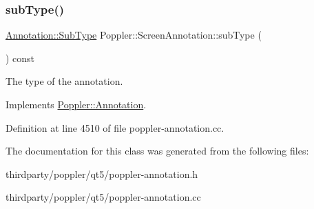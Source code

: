 \mbox{\label{class_poppler_1_1_screen_annotation_a7a8076dfda640ecf040db9acdd8b3ecf}} 
\subsubsection{\texorpdfstring{sub\+Type()}{subType()}}
{\footnotesize\ttfamily \hyperlink{class_poppler_1_1_annotation_a2d592999c330949d64679cfa9e81113f}{Annotation\+::\+Sub\+Type} Poppler\+::\+Screen\+Annotation\+::sub\+Type (\begin{DoxyParamCaption}{ }\end{DoxyParamCaption}) const\hspace{0.3cm}{\ttfamily [virtual]}}

The type of the annotation. 

Implements \hyperlink{class_poppler_1_1_annotation_aef7fa1532193b41fbeba6e577579d984}{Poppler\+::\+Annotation}.



Definition at line 4510 of file poppler-\/annotation.\+cc.



The documentation for this class was generated from the following files\+:\begin{DoxyCompactItemize}
\item 
thirdparty/poppler/qt5/poppler-\/annotation.\+h\item 
thirdparty/poppler/qt5/poppler-\/annotation.\+cc\end{DoxyCompactItemize}
